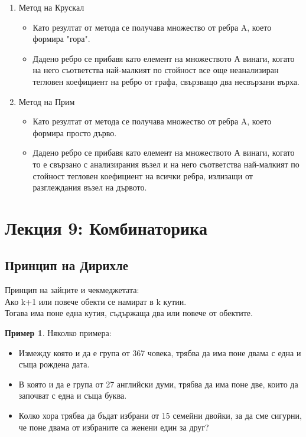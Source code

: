 \documentclass[fleqn, 12pt]{article}
\theoremstyle{definition}
\newtheorem{example}{Пример}[subsection]
\begin{document}
\begin{enumerate}
\item Метод на Крускал
\begin{itemize}
\item Като  резултат от метода се получава множество от ребра A, което формира "гора".
\item Дадено ребро се прибавя като елемент на множеството А винаги, когато на него съответства най-малкият по стойност все още неанализиран тегловен коефициент на ребро от графа,  свързващо два несвързани върха.
\end{itemize}
\item Метод на Прим
\begin{itemize}
\item Като резултат от метода се получава множество от ребра A, което формира просто дърво.
\item Дадено ребро се прибавя като елемент на множеството А винаги, когато  то е свързано с анализирания възел и на него съответства най-малкият по стойност тегловен коефициент на всички ребра, излизащи от разглеждания възел на дървото.
\end{itemize}
\end{enumerate}

\newpage
\section{Лекция 9: Комбинаторика}

\subsection{Принцип на Дирихле}
Принцип на зайците и чекмеджетата: \\
Ако k+1 или повече обекти се намират в k кутии. \\
Тогава има поне една кутия, съдържаща два или повече от обектите. 
\begin{example}
Няколко примера: 
\begin{itemize}
\item Измежду която и да е група от 367 човека, трябва да има поне  двама с една и съща рождена дата.
\item В която и да е група от 27 английски думи, трябва да има поне две, които да започват с една и съща буква. 
\item Колко хора трябва да бъдат избрани от 15 семейни двойки, за да сме сигурни, че поне двама от избраните са женени един за друг?
\end{itemize}
\end{example}
\end{document}
